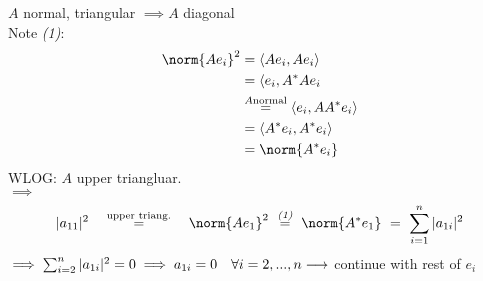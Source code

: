 
\begin{SolutionSheet}[\ref{sheet5}]
\begin{onehalfspace}

  \begin{Solution}
    \Claim $A$ normal, triangular $\implies A$ diagonal \\
    \Proof Note \textit{(1)}: \begin{align*}
        \norm{Ae_i}^2 &= \langle Ae_i, Ae_i \rangle \\
        &= \langle e_i, A^*Ae_i \\
        &\stackrel{A \text{normal}}{=} \langle e_i, AA^* e_i \rangle \\
        &= \langle A^*e_i , A^*e_i \rangle \\
        &= \norm{A^*e_i}
      \end{align*}
      WLOG: $A$ upper triangluar.\\
      $\implies$ \begin{equation*}
        | a_{11} |^2 \quad \stackrel{\text{upper triang.}}{=} \quad \norm{Ae_1}^2 \
        \stackrel{\textit{(1)}}{=} \ \norm{A^*e_1} \ = \ \sum_{i=1}^{n} | a_{1i} |^2
      \end{equation*}
      $\implies \sum_{i=2}^{n} | a_{1i}|^2 = 0 \\
      \implies a_{1i} = 0 \quad \forall i=2,...,n\\
      \longrightarrow$ continue with rest of $e_i$
  \end{Solution}


\end{onehalfspace}
\end{SolutionSheet}

